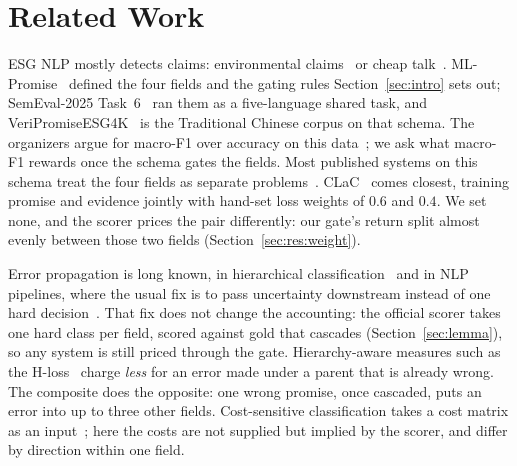 \section{Related Work}

 ESG NLP mostly detects claims: environmental
claims~\cite{stammbach2023environmental} or cheap talk~\cite{bingler2022cheaptalk}.
ML-Promise~\cite{seki2025mlpromise} defined the four fields and the gating rules
Section~\ref{sec:intro} sets out; SemEval-2025 Task~6~\cite{chen2025semeval} ran them as a
five-language shared task, and Veri\-Promise\-ESG4K~\cite{day2026veripromiseesg4k} is the Traditional
Chinese corpus on that schema. The organizers argue for macro-F1 over accuracy on this
data~\cite{huang2025rocling}; we ask what macro-F1 rewards once the schema gates the fields.
Most published systems on this schema treat the four fields as separate
problems~\cite{nishi2025wcteam,leesombatwathana2025cscu,wu2025cyut}. CLaC~\cite{turk2025clac} comes
closest, training promise and evidence jointly with hand-set loss weights of $0.6$ and $0.4$. We
set none, and the scorer prices the pair differently: our gate's return split almost
evenly between those two fields (Section~\ref{sec:res:weight}).

 Error propagation is long known, in hierarchical
classification~\cite{silla2011survey} and in NLP pipelines, where the usual fix is to pass
uncertainty downstream instead of one hard decision~\cite{finkel2006cascading}. That fix does not
change the accounting: the official scorer takes one hard class per field, scored against gold
that cascades (Section~\ref{sec:lemma}), so any system is still priced through the gate. Hierarchy-aware measures such as the H-loss~\cite{cesabianchi2006incremental}
charge \emph{less} for an error made under a parent that is already wrong. The composite does the
opposite: one wrong promise, once cascaded, puts an error into up to three other fields. Cost-sensitive
classification takes a cost matrix as an
input~\cite{elkan2001foundations}; here the costs are not supplied but
implied by the scorer, and differ by direction within one field.

